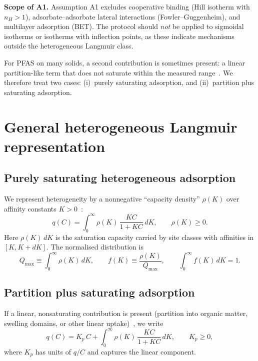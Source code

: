 \documentclass[12pt]{article}
\begin{document}
\textbf{Scope of A1.}  Assumption A1 excludes cooperative binding
(Hill isotherm with $n_H>1$), adsorbate--adsorbate lateral interactions
(Fowler--Guggenheim), and multilayer adsorption (BET).  The protocol
should \emph{not} be applied to sigmoidal isotherms or isotherms with
inflection points, as these indicate mechanisms outside the heterogeneous
Langmuir class.

For PFAS on many solids, a second contribution is sometimes present: a
linear partition-like term that does not saturate within the measured
range~\cite{Vieth1976}.  We therefore treat two cases:
(i)~purely saturating adsorption, and
(ii)~partition plus saturating adsorption.

\section{General heterogeneous Langmuir representation}

\subsection{Purely saturating heterogeneous adsorption}

We represent heterogeneity by a nonnegative ``capacity density''
$\rho(K)$ over affinity constants $K>0$~\cite{Sips1948,Jaroniec1988}:
\begin{equation}
  q(C) = \int_{0}^{\infty} \rho(K)\,\frac{KC}{1+KC}\,dK,
  \qquad \rho(K)\ge 0.
  \label{eq:het_langmuir}
\end{equation}
Here $\rho(K)\,dK$ is the saturation capacity carried by site classes
with affinities in $[K,K+dK]$.  The normalised distribution is
\begin{equation}
  Q_{\max} \equiv \int_0^\infty \rho(K)\,dK,
  \qquad
  f(K) \equiv \frac{\rho(K)}{Q_{\max}},
  \qquad
  \int_0^\infty f(K)\,dK = 1.
  \label{eq:f_def}
\end{equation}

\subsection{Partition plus saturating adsorption}

If a linear, nonsaturating contribution is present (partition into
organic matter, swelling domains, or other linear
uptake)~\cite{Vieth1976,Paul1976}, we write
\begin{equation}
  q(C) = K_p\,C + \int_{0}^{\infty} \rho(K)\,\frac{KC}{1+KC}\,dK,
  \qquad K_p \ge 0,
  \label{eq:partition_plus_langmuir}
\end{equation}
where $K_p$ has units of $q/C$ and captures the linear component.
\end{document}
